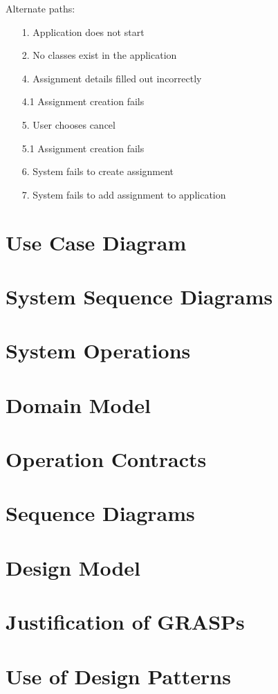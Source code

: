 \documentclass[12pt]{article}
\begin{document}
\noindent
Alternate paths:
\begin{enumerate}
	\item[1.] Application does not start
	\item[2.] No classes exist in the application
	\item[4.] Assignment details filled out incorrectly
	\item[4.1] Assignment creation fails
	\item[5.] User chooses cancel
	\item[5.1] Assignment creation fails
	\item[6.] System fails to create assignment
	\item[7.] System fails to add assignment to application
\end{enumerate}

\newpage

\section*{Use Case Diagram}

\newpage

\section*{System Sequence Diagrams}

\newpage

\section*{System Operations}

\newpage

\section*{Domain Model}

\newpage

\section*{Operation Contracts}

\newpage

\section*{Sequence Diagrams}

\newpage

\section*{Design Model}

\newpage

\section*{Justification of GRASPs}

\newpage

\section*{Use of Design Patterns}
\end{document}
